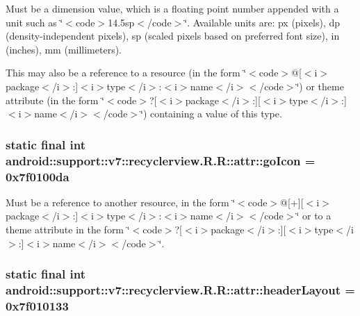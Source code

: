 Must be a dimension value, which is a floating point number appended with a unit such as \char`\"{}$<$code$>$14.5sp$<$/code$>$\char`\"{}. Available units are: px (pixels), dp (density-independent pixels), sp (scaled pixels based on preferred font size), in (inches), mm (millimeters). 

This may also be a reference to a resource (in the form \char`\"{}$<$code$>$@\mbox{[}$<$i$>$package$<$/i$>$:\mbox{]}$<$i$>$type$<$/i$>$:$<$i$>$name$<$/i$>$$<$/code$>$\char`\"{}) or theme attribute (in the form \char`\"{}$<$code$>$?\mbox{[}$<$i$>$package$<$/i$>$:\mbox{]}\mbox{[}$<$i$>$type$<$/i$>$:\mbox{]}$<$i$>$name$<$/i$>$$<$/code$>$\char`\"{}) containing a value of this type. \hypertarget{classandroid_1_1support_1_1v7_1_1recyclerview_1_1_r_1_1attr_5a1658b0a2067c34be513f446b828955}{
\subsubsection[{goIcon}]{\setlength{\rightskip}{0pt plus 5cm}static final int android::support::v7::recyclerview.R.R::attr::goIcon = 0x7f0100da}}
\label{classandroid_1_1support_1_1v7_1_1recyclerview_1_1_r_1_1attr_5a1658b0a2067c34be513f446b828955}


Must be a reference to another resource, in the form \char`\"{}$<$code$>$@\mbox{[}+\mbox{]}\mbox{[}$<$i$>$package$<$/i$>$:\mbox{]}$<$i$>$type$<$/i$>$:$<$i$>$name$<$/i$>$$<$/code$>$\char`\"{} or to a theme attribute in the form \char`\"{}$<$code$>$?\mbox{[}$<$i$>$package$<$/i$>$:\mbox{]}\mbox{[}$<$i$>$type$<$/i$>$:\mbox{]}$<$i$>$name$<$/i$>$$<$/code$>$\char`\"{}. \hypertarget{classandroid_1_1support_1_1v7_1_1recyclerview_1_1_r_1_1attr_2616921fcda3ce720d21d0744ed0dba7}{
\subsubsection[{headerLayout}]{\setlength{\rightskip}{0pt plus 5cm}static final int android::support::v7::recyclerview.R.R::attr::headerLayout = 0x7f010133}}
\label{classandroid_1_1support_1_1v7_1_1recyclerview_1_1_r_1_1attr_2616921fcda3ce720d21d0744ed0dba7}


